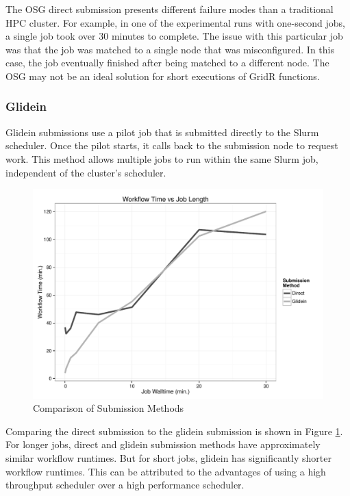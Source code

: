 The OSG direct submission presents different failure modes than a traditional HPC cluster.  For example, in one of the experimental runs with one-second jobs, a single job took over 30 minutes to complete.  The issue with this particular job was that the job was matched to a single node that was misconfigured.  In this case, the job eventually finished after being matched to a different node.  The OSG may not be an ideal solution for short executions of GridR functions.

\subsubsection{Glidein}
Glidein submissions use a pilot job that is submitted directly to the Slurm scheduler.  Once the pilot starts, it calls back to the submission node to request work.  This method allows multiple jobs to run within the same Slurm job, independent of the cluster's scheduler.  

\begin{figure}[h!t]
\centering
\includegraphics[width=\textwidth]{BoscoRImages/ComparisonPlot-color.pdf}
\caption{Comparison of Submission Methods}
\label{fig:comparesubmit}
\end{figure}

Comparing the direct submission to the glidein submission is shown in Figure \ref{fig:comparesubmit}.  For longer jobs, direct and glidein submission methods have approximately similar workflow runtimes.  But for short jobs, glidein has significantly shorter workflow runtimes.  This can be attributed to the advantages of using a high throughput scheduler over a high performance scheduler.

